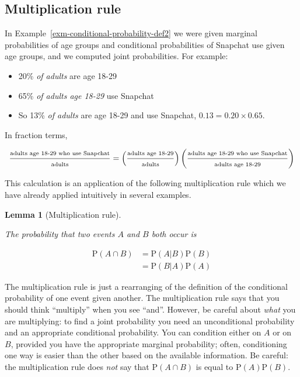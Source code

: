 \documentclass[
  letterpaper,
  DIV=11,
  numbers=noendperiod]{scrreprt}
\providecommand{\tightlist}{%
  \setlength{\itemsep}{0pt}\setlength{\parskip}{0pt}}
\theoremstyle{plain}
\newtheorem{lemma}{Lemma}[chapter]
\theoremstyle{definition}
\theoremstyle{definition}
\theoremstyle{definition}
\theoremstyle{remark}
\begin{document}
\subsection{Multiplication rule}\label{multiplication-rule}

In Example~\ref{exm-conditional-probability-def2} we were given marginal
probabilities of age groups and conditional probabilities of Snapchat
use given age groups, and we computed joint probabilities. For example:

\begin{itemize}
\tightlist
\item
  20\% \emph{of adults} are age 18-29
\item
  65\% \emph{of adults age 18-29} use Snapchat
\item
  So 13\% \emph{of adults} are age 18-29 and use Snapchat,
  \(0.13 = 0.20\times 0.65\).
\end{itemize}

In fraction terms,

\[
\scriptsize{
\frac{\text{adults age 18-29 who use Snapchat}}{\text{adults}} = \left(\frac{\text{adults age 18-29}}{\text{adults}}\right)\left(\frac{\text{adults age 18-29 who use Snapchat}}{\text{adults age 18-29}}\right)
}
\]

This calculation is an application of the following multiplication rule
which we have already applied intuitively in several examples.

\begin{lemma}[Multiplication
rule]\protect\hypertarget{lem-multiplication-rule}{}\label{lem-multiplication-rule}

The probability that two events \(A\) and \(B\) both occur is

\end{lemma}

\[
\begin{aligned}
\textrm{P}(A \cap B) & = \textrm{P}(A|B)\textrm{P}(B)\\
& = \textrm{P}(B|A)\textrm{P}(A)
\end{aligned}
\]

The multiplication rule is just a rearranging of the definition of the
conditional probability of one event given another. The multiplication
rule says that you should think ``multiply'' when you see ``and''.
However, be careful about \emph{what} you are multiplying: to find a
joint probability you need an unconditional probability and an
appropriate conditional probability. You can condition either on \(A\)
or on \(B\), provided you have the appropriate marginal probability;
often, conditioning one way is easier than the other based on the
available information. Be careful: the multiplication rule does
\emph{not} say that \(\textrm{P}(A\cap B)\) is equal to
\(\textrm{P}(A)\textrm{P}(B)\).
\end{document}
